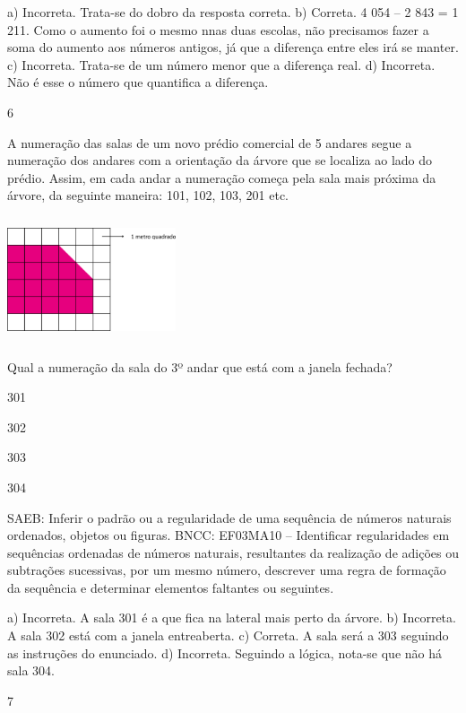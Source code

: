 {\begin{escolha}
{a) Incorreta. Trata-se do dobro da resposta correta.
b) Correta. 4 054 -- 2 843 = 1 211. Como o aumento foi o mesmo nnas duas escolas, não
precisamos fazer a soma do aumento aos números antigos, já que a diferença entre eles irá se manter.
c) Incorreta. Trata-se de um número menor que a diferença real.
d) Incorreta. Não é esse o número que quantifica a diferença.

\num{6}

A numeração das salas de um novo prédio comercial de 5 andares segue a
numeração dos andares com a orientação da árvore que se localiza ao
lado do prédio. Assim, em cada andar a numeração começa pela sala mais
próxima da árvore, da seguinte maneira: 101, 102, 103, 201 etc.


\includegraphics[width=1.96154in,height=1.44792in]{media/image108.png}

Qual a numeração da sala do 3º andar que está com a janela fechada?

\begin{escolha}
\item
  301
\item
  302
\item
  303
\item
  304
\end{escolha}

SAEB: Inferir o padrão ou a regularidade de uma sequência de
números naturais ordenados, objetos ou figuras.
BNCC: EF03MA10 -- Identificar regularidades em sequências ordenadas de números naturais,
resultantes da realização de adições ou subtrações sucessivas, por um mesmo número,
descrever uma regra de formação da sequência e determinar elementos faltantes ou seguintes.

a) Incorreta. A sala 301 é a que fica na lateral mais perto da árvore.
b) Incorreta. A sala 302 está com a janela entreaberta.
c) Correta. A sala será a 303 seguindo as instruções do enunciado.
d) Incorreta. Seguindo a lógica, nota-se que não há sala 304.

\num{7}

}
\end{escolha}}
